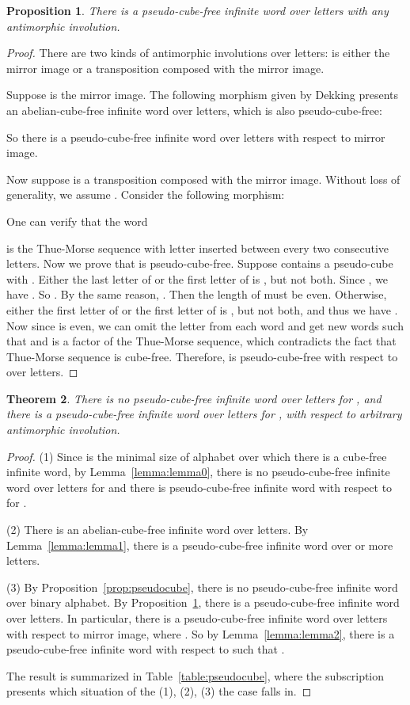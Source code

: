 \documentclass[12pt]{article}
\newtheorem{theorem}{Theorem}
\newtheorem{proposition}[theorem]{Proposition}
\begin{document}
\begin{proposition}\label{prop:pseudodekking}
There is a pseudo-cube-free infinite word over  letters with any
antimorphic involution.
\end{proposition}
\begin{proof}
There are two kinds of antimorphic involutions over  letters:
 is either the mirror image or a transposition composed with
the mirror image.

Suppose  is the mirror image. The following morphism 
given by Dekking \cite{Dekking1979} presents an abelian-cube-free
infinite word  over  letters, which is also
pseudo-cube-free:

So there is a pseudo-cube-free infinite word 
over  letters with respect to mirror image.

Now suppose  is a transposition composed with the mirror
image. Without loss of generality, we assume
. Consider the following morphism:

One can verify that the word

is the Thue-Morse sequence \cite{Thue1912} with letter 
inserted between every two consecutive letters. Now we prove that
 is pseudo-cube-free. Suppose  contains a
pseudo-cube  with . Either
the last letter of  or the first letter of  is ,
but not both. Since , we have
. So . By the same reason, .
Then the length of  must be even. Otherwise, either the
first letter of  or the first letter of  is , but
not both, and thus we have . Now since
 is even, we can omit the letter
 from each word and get new words  such
that  and  is a factor of the
Thue-Morse sequence, which contradicts the fact that Thue-Morse
sequence is cube-free. Therefore,  is
pseudo-cube-free with respect to  over
 letters.
\end{proof}


\begin{theorem}
There is no pseudo-cube-free infinite word over  letters for
, and there is a pseudo-cube-free infinite word over 
letters for , with respect to arbitrary antimorphic
involution.
\end{theorem}
\begin{proof}
(1) Since  is the minimal size of alphabet over which there is a
cube-free infinite word, by Lemma~\ref{lemma:lemma0}, there is no
pseudo-cube-free infinite word over  letters for  and
there is pseudo-cube-free infinite word with respect to  for
.

(2) There is an abelian-cube-free infinite word 
over  letters. By Lemma~\ref{lemma:lemma1}, there is a
pseudo-cube-free infinite word over  or more letters.

(3) By Proposition~\ref{prop:pseudocube}, there is no
pseudo-cube-free infinite word over binary alphabet. By
Proposition~\ref{prop:pseudodekking}, there is a pseudo-cube-free
infinite word over  letters. In particular, there is a
pseudo-cube-free infinite word over  letters with respect to
mirror image, where . So
by Lemma~\ref{lemma:lemma2}, there is a pseudo-cube-free infinite
word with respect to  such that
.

The result is summarized in Table~\ref{table:pseudocube}, where the
subscription presents which situation of the (1), (2), (3) the case
falls in.
\end{proof}
\end{document}
